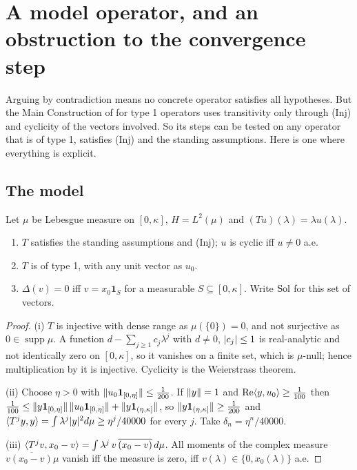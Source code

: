 \section{A model operator, and an obstruction to the convergence step}\label{sec:model}

Arguing by contradiction means no concrete operator satisfies all hypotheses. But the Main
Construction of \paper{} for type 1 operators uses transitivity only through \textup{(Inj)} and
cyclicity of the vectors involved. So its steps can be tested on any operator that is of type 1,
satisfies \textup{(Inj)} and the standing assumptions. Here is one where everything is explicit.

\subsection{The model}
Let $\mu$ be Lebesgue measure on $[0,\kappa]$, $H=L^2(\mu)$ and $(Tu)(\lambda)=\lambda u(\lambda)$.

\begin{lemma}\label{lem:model}\stproved{}
\begin{enumerate}[label=(\roman*)]
\item $T$ satisfies the standing assumptions and \textup{(Inj)}; $u$ is cyclic iff $u\ne0$ a.e.
\item $T$ is of type 1, with any unit vector as $u_0$.
\item $\Delta(v)=0$ iff $v=x_0\mathbf 1_S$ for a measurable $S\subseteq[0,\kappa]$. Write $\operatorname{Sol}$
for this set of vectors.
\end{enumerate}
\end{lemma}
\begin{proof}
(i) $T$ is injective with dense range as $\mu(\{0\})=0$, and not surjective as
$0\in\operatorname{supp}\mu$. A function $d-\sum_{j\ge1}c_j\lambda^j$ with $d\ne0$,
$\lvert c_j\rvert\le1$ is real-analytic and not identically zero on $[0,\kappa]$, so it vanishes on a
finite set, which is $\mu$-null; hence multiplication by it is injective. Cyclicity is the
Weierstrass theorem.

(ii) Choose $\eta>0$ with $\lVert u_0\mathbf 1_{[0,\eta]}\rVert\le\frac1{200}$. If $\lVert y\rVert=1$ and
$\operatorname{Re}\langle y,u_0\rangle\ge\frac1{100}$ then
$\frac1{100}\le\lVert y\mathbf 1_{[0,\eta]}\rVert\,\lVert u_0\mathbf 1_{[0,\eta]}\rVert+\lVert y\mathbf 1_{(\eta,\kappa]}\rVert$,
so $\lVert y\mathbf 1_{(\eta,\kappa]}\rVert\ge\frac1{200}$ and
$\langle T^jy,y\rangle=\int\lambda^j\lvert y\rvert^2d\mu\ge\eta^j/40000$ for every $j$. Take
$\delta_n=\eta^n/40000$.

(iii) $\langle T^jv,x_0-v\rangle=\int\lambda^j\,v\,\overline{(x_0-v)}\,d\mu$. All moments of the complex
measure $v\overline{(x_0-v)}\mu$ vanish iff the measure is zero, iff $v(\lambda)\in\{0,x_0(\lambda)\}$
a.e.
\end{proof}

